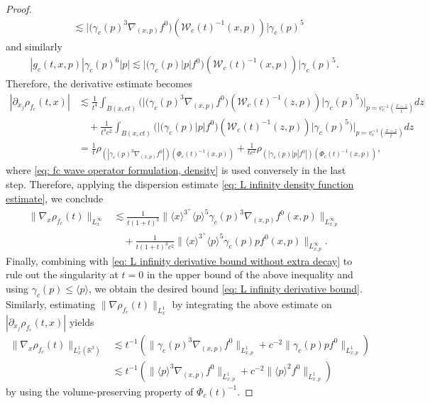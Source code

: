 \documentclass[reqno, 11pt, letterpaper]{amsart}
\theoremstyle{remark}
\numberwithin{equation}{section}
\numberwithin{theorem}{section}
\numberwithin{table}{section}
\numberwithin{figure}{section}
\begin{document}
\begin{proof}
$$\begin{aligned}
&\lesssim \Big|\Big(\gamma_c(p)^3\nabla_{(x,p)}f^0\Big)(\mathcal{W}_c(t)^{-1}(x,p))\Big|\gamma_c(p)^5
\end{aligned}$$
and similarly
$$\begin{aligned}
|g_c(t,x,p)|  \gamma_c(p)^6 |p|\lesssim \Big|\Big(\gamma_c(p) |p|f^0\Big)(\mathcal{W}_c(t)^{-1}(x,p))\Big|\gamma_c(p)^5.
\end{aligned}$$
Therefore, the derivative estimate becomes
$$\begin{aligned}
|\partial_{x_j}\rho_{f_c}(t,x)|&\lesssim\frac{1}{t^4}\int_{B(x,ct)} \biggl ( \Big|\Big(\gamma_c(p)^3\nabla_{(x,p)}f^0\Big)(\mathcal{W}_c(t)^{-1}(z,p))\Big|\gamma_c(p)^5 \bigg) \biggl |_{p=v_c^{-1} \left (\frac{x-z}{t} \right)} dz\\
&\quad+\frac{1}{t^4c^2}\int_{B(x,ct)} \biggl (\Big|\Big(\gamma_c(p) |p|f^0\Big)(\mathcal{W}_c(t)^{-1}(z,p))\Big|\gamma_c(p)^5\biggr ) \biggl |_{p=v_c^{-1} \left (\frac{x-z}{t} \right)} dz\\
&=\frac{1}{t}\rho_{(|\gamma_c(p)^3\nabla_{(x,p)}f^0|)(\Phi_c(t)^{-1}(x,p))}+\frac{1}{tc^2}\rho_{(|\gamma_c(p)|p|f^0|)(\Phi_c(t)^{-1}(x,p))},
\end{aligned}$$
where \eqref{eq: fc wave operator formulation, density} is used conversely in the last step. Therefore, applying the dispersion estimate \eqref{eq: L infinity density function estimate}, we conclude
$$\begin{aligned}
\|\nabla_x\rho_{f_c}(t)\|_{L_x^\infty}&\lesssim\frac{1}{t(1+t)^3}\Big\|\langle x\rangle^{3^+}\langle p\rangle^{5}\gamma_c(p)^3\nabla_{(x,p)}f^0(x,p)\Big\|_{L_{x,p}^\infty}\\
&\quad+\frac{1}{t(1+t)^3c^2} \Big\|\langle x\rangle^{3^+}\langle p\rangle^5\gamma_c(p)pf^0(x,p)\Big\|_{L_{x,p}^\infty}.
\end{aligned}$$
Finally, combining with \eqref{eq: L infinity derivative bound without extra decay} to rule out the singularity at $t=0$ in the upper bound of the above inequality and using $\gamma_c(p) \leq \langle p \rangle$, we obtain the desired bound \eqref{eq: L infinity derivative bound}.
Similarly, estimating $\| \nabla \rho_{f_c}(t) \|_{L^1_x}$ by integrating the above estimate on $|\partial_{x_j}\rho_{f_c}(t,x)|$ yields 
$$\begin{aligned}
\|\nabla_x\rho_{f_c}(t)\|_{L_x^1(\mathbb{R}^3)} &\lesssim t^{-1}\left ( \| \gamma_c(p)^3 \nabla_{(x,p)} f^0 \|_{L^1_{x,p}} + c^{-2} \| \gamma_c(p) p f^0 \|_{L^1_{x,p}} \right )\\
&\lesssim t^{-1}\left ( \| \langle p \rangle^3 \nabla_{(x,p)} f^0 \|_{L^1_{x,p}} + c^{-2} \| \langle p \rangle^2 f^0 \|_{L^1_{x,p}} \right )
\end{aligned}$$
by using the volume-preserving property of $\Phi_c(t)^{-1}$.
\end{proof}
\end{document}
